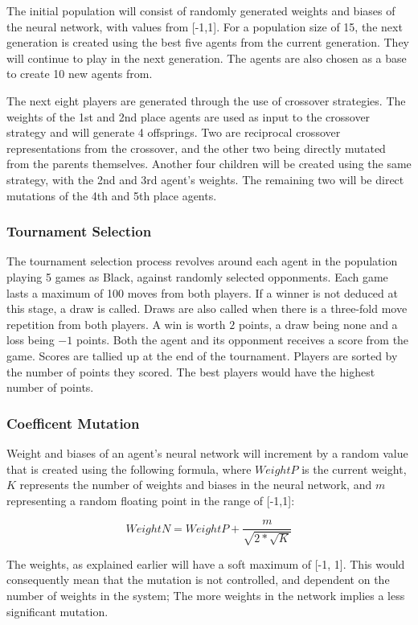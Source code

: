 \documentclass[12pt,a4paper]{article}
\begin{document}
    The initial population will consist of randomly generated weights and biases of the neural network, with values from [-1,1]. For a population size of 15, the next generation is created using the best five agents from the current generation. They will continue to play in the next generation. The agents are also chosen as a base to create 10 new agents from.

    The next eight players are generated through the use of crossover strategies. The weights of the 1st and 2nd place agents are used as input to the crossover strategy and will generate 4 offsprings. Two are reciprocal crossover representations from the crossover, and the other two being directly mutated from the parents themselves. Another four children will be created using the same strategy, with the 2nd and 3rd agent's weights.
    The remaining two will be direct mutations of the 4th and 5th place agents.

\subsubsection{Tournament Selection}

    The tournament selection process revolves around each agent in the population playing 5 games as Black, against randomly selected opponments. Each game lasts a maximum of 100 moves from both players. If a winner is not deduced at this stage, a draw is called. Draws are also called when there is a three-fold move repetition from both players. A win is worth $2$ points, a draw being none and a loss being $-1$ points. Both the agent and its opponment receives a score from the game. Scores are tallied up at the end of the tournament. Players are sorted by the number of points they scored. The best players would have the highest number of points.

\subsubsection{Coefficent Mutation}

    Weight and biases of an agent's neural network will increment by a random value that is created using the following formula, where $WeightP$ is the current weight, $K$ represents the number of weights and biases in the neural network, and $m$ representing a random floating point in the range of [-1,1]:

    $$ WeightN = WeightP + \frac{m}{\sqrt{2 * \sqrt{K} }}$$

    The weights, as explained earlier will have a soft maximum of [-1, 1]. This  would consequently mean that the mutation is not controlled, and dependent on the number of weights in the system; The more weights in the network implies a less significant mutation.
\end{document}
